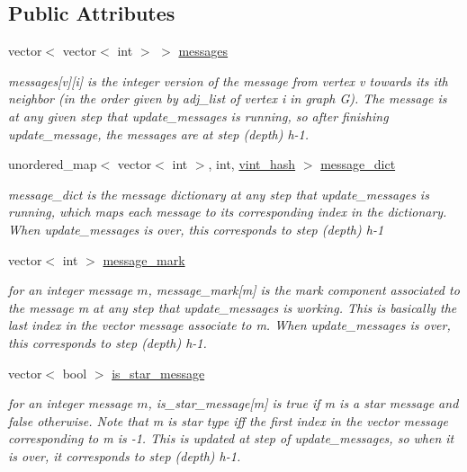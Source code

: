 \subsection*{Public Attributes}
\begin{DoxyCompactItemize}
\item 
vector$<$ vector$<$ int $>$ $>$ \hyperlink{classgraph__message_af680c8a1755cf8d4aba389c1a3d6634e}{messages}
\begin{DoxyCompactList}\small\item\em messages\mbox{[}v\mbox{]}\mbox{[}i\mbox{]} is the integer version of the message from vertex v towards its ith neighbor (in the order given by adj\+\_\+list of vertex i in graph G). The message is at any given step that update\+\_\+messages is running, so after finishing update\+\_\+message, the messages are at step (depth) h-\/1. \end{DoxyCompactList}\item 
unordered\+\_\+map$<$ vector$<$ int $>$, int, \hyperlink{structvint__hash}{vint\+\_\+hash} $>$ \hyperlink{classgraph__message_a557473b726dc5d80618055a6b843670f}{message\+\_\+dict}
\begin{DoxyCompactList}\small\item\em message\+\_\+dict is the message dictionary at any step that update\+\_\+messages is running, which maps each message to its corresponding index in the dictionary. When update\+\_\+messages is over, this corresponds to step (depth) h-\/1 \end{DoxyCompactList}\item 
vector$<$ int $>$ \hyperlink{classgraph__message_a49d9af5150daf0599c29fe18cb032fa5}{message\+\_\+mark}
\begin{DoxyCompactList}\small\item\em for an integer message $m$, message\+\_\+mark\mbox{[}m\mbox{]} is the mark component associated to the message m at any step that update\+\_\+messages is working. This is basically the last index in the vector message associate to m. When update\+\_\+messages is over, this corresponds to step (depth) h-\/1. \end{DoxyCompactList}\item 
vector$<$ bool $>$ \hyperlink{classgraph__message_a55ff5531a0043106369e84a7bc45e22d}{is\+\_\+star\+\_\+message}
\begin{DoxyCompactList}\small\item\em for an integer message $m$, is\+\_\+star\+\_\+message\mbox{[}m\mbox{]} is true if m is a star message and false otherwise. Note that m is star type iff the first index in the vector message corresponding to m is -\/1. This is updated at step of update\+\_\+messages, so when it is over, it corresponds to step (depth) h-\/1. \end{DoxyCompactList}\end{DoxyCompactItemize}
